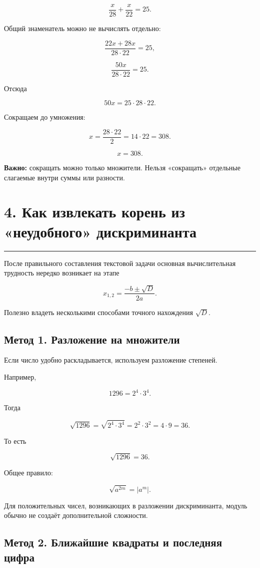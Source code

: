 \documentclass[a4paper,12pt]{article}
\newcommand{\checksection}[1]{%
  \section*{\color{darkaccent}#1}
  \vspace{-0.6em}
  {\color{accent!70}\rule{\linewidth}{0.6pt}}
  \vspace{0.35em}
}
\newcommand{\keyidea}[1]{%
  \textcolor{darkaccent}{\textbf{#1}}
}
\begin{document}
\[
\frac{x}{28}+\frac{x}{22}=25.
\]

Общий знаменатель можно не вычислять отдельно:

\[
\frac{22x+28x}{28\cdot22}=25,
\]

\[
\frac{50x}{28\cdot22}=25.
\]

Отсюда

\[
50x=25\cdot28\cdot22.
\]

Сокращаем до умножения:

\[
x=\frac{28\cdot22}{2}=14\cdot22=308.
\]

\[
\boxed{x=308}.
\]

\keyidea{Важно:} сокращать можно только множители. Нельзя «сокращать» отдельные слагаемые внутри суммы или разности.


\checksection{4. Как извлекать корень из «неудобного» дискриминанта}

После правильного составления текстовой задачи основная вычислительная трудность нередко возникает на этапе

\[
x_{1,2}=\frac{-b\pm\sqrt D}{2a}.
\]

Полезно владеть несколькими способами точного нахождения \(\sqrt D\).

\subsection*{\color{darkaccent}Метод 1. Разложение на множители}

Если число удобно раскладывается, используем разложение степеней.

Например,

\[
1296=2^4\cdot3^4.
\]

Тогда

\[
\sqrt{1296}
=
\sqrt{2^4\cdot3^4}
=
2^2\cdot3^2
=
4\cdot9
=
36.
\]

То есть

\[
\boxed{\sqrt{1296}=36}.
\]

Общее правило:

\[
\sqrt{a^{2m}}=|a^m|.
\]

Для положительных чисел, возникающих в разложении дискриминанта, модуль обычно не создаёт дополнительной сложности.

\subsection*{\color{darkaccent}Метод 2. Ближайшие квадраты и последняя цифра}
\end{document}
